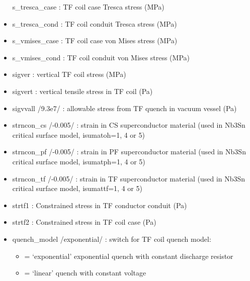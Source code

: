 \documentclass[]{article}
\begin{document}
\begin{itemize}
  s\_tresca\_case : TF coil case Tresca stress (MPa)
\item
  s\_tresca\_cond : TF coil conduit Tresca stress (MPa)
\item
  s\_vmises\_case : TF coil case von Mises stress (MPa)
\item
  s\_vmises\_cond : TF coil conduit von Mises stress (MPa)
\item
  sigver : vertical TF coil stress (MPa)
\item
  sigvert : vertical tensile stress in TF coil (Pa)
\item
  sigvvall /9.3e7/ : allowable stress from TF quench in vacuum vessel
  (Pa)
\item
  strncon\_cs /-0.005/ : strain in CS superconductor material (used in
  Nb3Sn critical surface model, isumatoh=1, 4 or 5)
\item
  strncon\_pf /-0.005/ : strain in PF superconductor material (used in
  Nb3Sn critical surface model, isumatph=1, 4 or 5)
\item
  strncon\_tf /-0.005/ : strain in TF superconductor material (used in
  Nb3Sn critical surface model, isumattf=1, 4 or 5)
\item
  strtf1 : Constrained stress in TF conductor conduit (Pa)
\item
  strtf2 : Constrained stress in TF coil case (Pa)
\item
  quench\_model /exponential/ : switch for TF coil quench model:

  \begin{itemize}
  \itemsep1pt\parskip0pt
  \item
    = `exponential' exponential quench with constant discharge resistor
  \item
    = `linear' quench with constant voltage
  \end{itemize}


\end{itemize}
\end{document}
